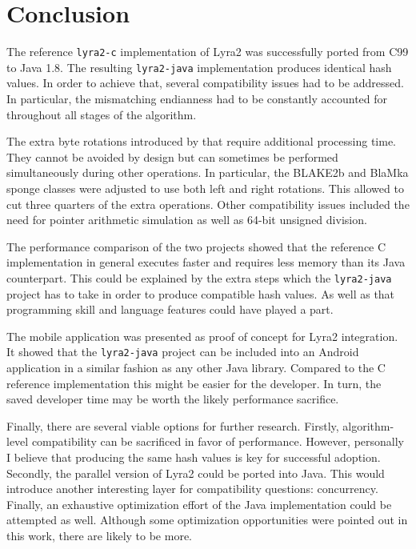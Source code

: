 \chapter{Conclusion}
\label{sec:conclusion}

The reference \texttt{lyra2-c} implementation of Lyra2 was successfully ported from C99 to Java 1.8. The resulting \texttt{lyra2-java} implementation produces identical hash values. In order to achieve that, several compatibility issues had to be addressed. In particular, the mismatching endianness had to be constantly accounted for throughout all stages of the algorithm.

The extra byte rotations introduced by that require additional processing time. They cannot be avoided by design but can sometimes be performed simultaneously during other operations. In particular, the BLAKE2b and BlaMka sponge classes were adjusted to use both left and right rotations. This allowed to cut three quarters of the extra operations. Other compatibility issues included the need for pointer arithmetic simulation as well as 64-bit unsigned division.

The performance comparison of the two projects showed that the reference C implementation in general executes faster and requires less memory than its Java counterpart. This could be explained by the extra steps which the \texttt{lyra2-java} project has to take in order to produce compatible hash values. As well as that programming skill and language features could have played a part.

The mobile application was presented as proof of concept for Lyra2 integration. It showed that the \texttt{lyra2-java} project can be included into an Android application in a similar fashion as any other Java library. Compared to the C reference implementation this might be easier for the developer. In turn, the saved developer time may be worth the likely performance sacrifice.

Finally, there are several viable options for further research. Firstly, algorithm-level compatibility can be sacrificed in favor of performance. However, personally I believe that producing the same hash values is key for successful adoption. Secondly, the parallel version of Lyra2 could be ported into Java. This would introduce another interesting layer for compatibility questions: concurrency. Finally, an exhaustive optimization effort of the Java implementation could be attempted as well. Although some optimization opportunities were pointed out in this work, there are likely to be more.
